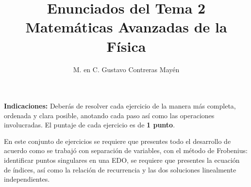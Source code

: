 
\title{Enunciados del Tema 2 \\[0.3em]  \large{Matemáticas Avanzadas de la Física}\vspace{-3ex}}
\author{M. en C. Gustavo Contreras Mayén}
\date{ }

\vspace{-4cm}
\maketitle
\fontsize{14}{14}\selectfont

\textbf{Indicaciones: } Deberás de resolver cada ejercicio de la manera más completa, ordenada y clara posible, anotando cada paso así como las operaciones involucradas. El puntaje de cada ejercicio es de \textbf{1 punto}.
\par
En este conjunto de ejercicios se requiere que presentes todo el desarrollo de acuerdo como se trabajó con separación de variables, con el método de Frobenius: identificar puntos singulares en una EDO, se requiere que presentes la ecuación de índices, así como la relación de recurrencia y las dos soluciones linealmente independientes.
\par
\noindent
\begin{center}
\end{center}

